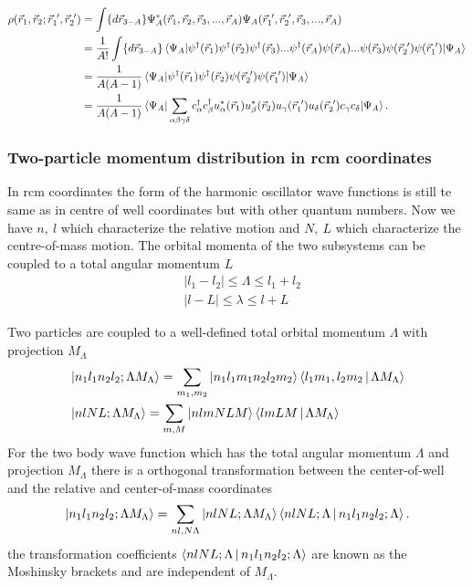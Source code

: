 \documentclass[12pt]{article}
\begin{document}
\begin{align}
\rho(\vec{r}_1, \vec{r}_2; \vec{r}_1^{\ \prime}, \vec{r}_2^{\ \prime}) & =  \int \{d\vec{r}_{3-A}\} \Psi^*_A(\vec{r}_1,\vec{r}_2,\vec{r}_3, ... ,\vec{r}_A)\Psi_A(\vec{r}_1^{\ \prime},\vec{r}_2^{\ \prime},\vec{r}_3, ... ,\vec{r}_A) \\
& = \frac{1}{A!} \int \{d\vec{r}_{3-A}\} \braket{\Psi_A | \psi^\dagger(\vec{r}_1) \psi^\dagger(\vec{r}_2)\psi^\dagger(\vec{r}_3) ...\psi^\dagger(\vec{r}_A) \psi(\vec{r}_A) ...\psi(\vec{r}_3)\psi(\vec{r}^{\ \prime}_2) \psi(\vec{r}^{\ \prime}_1)|\Psi_A } \\
& = \frac{1}{A(A-1)} \braket{\Psi_A | \psi^\dagger(\vec{r}_1) \psi^\dagger(\vec{r}_2)\psi(\vec{r}^{\ \prime}_2) \psi(\vec{r}^{\ \prime}_1)|\Psi_A } \\
& = \frac{1}{A(A-1)} \braket{\Psi_A | \sum_{\alpha\beta\gamma\delta} c^\dagger_\alpha c^\dagger_\beta u^*_\alpha(\vec{r}_1) u^*_\beta(\vec{r}_2) u_\gamma(\vec{r}^{\ \prime}_1) u_\delta(\vec{r}^{\ \prime}_2)c_\gamma c_\delta|\Psi_A }.
\end{align}

\subsubsection{Two-particle momentum distribution in rcm coordinates}

In rcm coordinates the form of the harmonic oscillator wave functions is still te same as in centre of well coordinates but with other quantum numbers. Now we have $n,\  l$ which characterize the relative motion and $N,\ L$ which characterize the centre-of-mass motion. The orbital momenta of the two subsystems can be coupled to a total angular momentum $L$ 
\begin{align}
& \left| l_1-l_2 \right| \leq \Lambda \leq l_1 + l_2 \\
& \left| l-L \right| \leq \lambda \leq l+ L
\end{align}

Two particles are coupled to a well-defined total orbital momentum $\Lambda$ with projection $M_\Lambda$
\begin{align}
&\Ket{n_1l_1n_2l_2;\Lambda M_\Lambda} = \sum_{m_1, m_2} \Ket{n_1l_1m_1n_2l_2m_2} \Braket{l_1m_1,l_2m_2| \Lambda M_\Lambda} \\
&\Ket{nlNL;\Lambda M_\Lambda} = \sum_{m, M} \Ket{nlm NLM} \Braket{lm LM|\Lambda M_\Lambda} 
\end{align}
For the two body wave function which has the total angular momentum $\Lambda$  and projection $M_\Lambda$ there is a orthogonal transformation between the center-of-well and the relative and center-of-mass coordinates
\begin{align}
\Ket{n_1l_1n_2l_2;\Lambda M_\Lambda} = \sum_{nl, N\Lambda} \Ket{nlNL;\Lambda M_\Lambda} \Braket{nlNL;\Lambda | n_1l_1n_2l_2;\Lambda}.
\end{align}
the transformation coefficients $\Braket{nlNL;\Lambda | n_1l_1n_2l_2;\Lambda}$ are known as the Moshinsky brackets and are independent of $M_\Lambda$.
\end{document}

